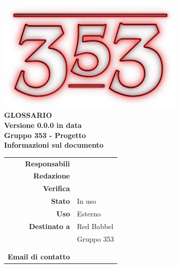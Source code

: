 \documentclass[openany, a4paper, 12pt]{report}
\begin{document}
\begin{titlepage}
\centering
\vfill
{
	\bfseries
	\vskip2cm
	\includegraphics[width=9cm]{../../common/images/logo.png} \\
	\vfill
	\Huge{GLOSSARIO}\\
	\vfill
	\Large Versione 0.0.0 in data \\
	\large Gruppo 353 - Progetto \progetto \\
	\vfill
	\normalsize Informazioni sul documento\\
	\begin{table}[htbp]
		\centering
		\renewcommand\arraystretch{1.2}
		\begin{tabular}{r|l}
			\hline
			\textbf{Responsabili}	& \Elena\\
			
			\textbf{Redazione} 		& \Valentina \\
			\textbf{Verifica} 		& \Davide \\	
			
			\textbf{Stato} 			& In uso\\
			\textbf{Uso}			& Esterno\\
			\textbf{Destinato a}   	& Red Babbel\\
									& Gruppo 353\\
									& \Vardanega\\
									& \Cardin\\
			
			\textbf{Email di contatto}	& \mailleaf
		\end{tabular}
	\end{table}
	\vfill 
}      
\end{titlepage}


\printglossaries
 
\end{document}
